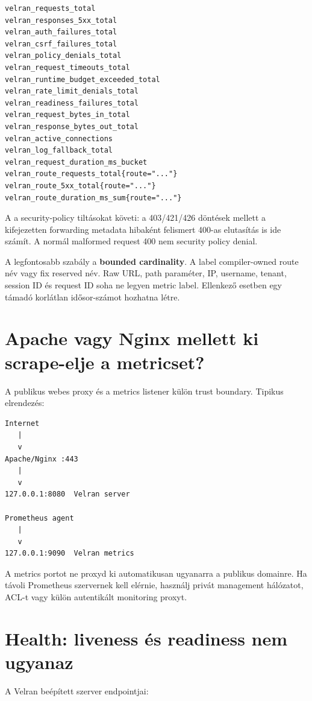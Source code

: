 \begin{lstlisting}
velran_requests_total
velran_responses_5xx_total
velran_auth_failures_total
velran_csrf_failures_total
velran_policy_denials_total
velran_request_timeouts_total
velran_runtime_budget_exceeded_total
velran_rate_limit_denials_total
velran_readiness_failures_total
velran_request_bytes_in_total
velran_response_bytes_out_total
velran_active_connections
velran_log_fallback_total
velran_request_duration_ms_bucket
velran_route_requests_total{route="..."}
velran_route_5xx_total{route="..."}
velran_route_duration_ms_sum{route="..."}
\end{lstlisting}

A  a security-policy tiltásokat követi: a 403/421/426 döntések mellett a kifejezetten forwarding metadata hibaként felismert 400-as elutasítás is ide számít. A normál malformed request 400 nem security policy denial.

A legfontosabb szabály a \textbf{bounded cardinality}. A  label compiler-owned route név vagy fix reserved név. Raw URL, path paraméter, IP, username, tenant, session ID és request ID soha ne legyen metric label. Ellenkező esetben egy támadó korlátlan idősor-számot hozhatna létre.

\Needspace{0.42\textheight}
\section{Apache vagy Nginx mellett ki scrape-elje a metricset?}

A publikus webes proxy és a metrics listener külön trust boundary. Tipikus elrendezés:

\begin{lstlisting}
Internet
   |
   v
Apache/Nginx :443
   |
   v
127.0.0.1:8080  Velran server

Prometheus agent
   |
   v
127.0.0.1:9090  Velran metrics
\end{lstlisting}

A metrics portot ne proxyd ki automatikusan ugyanarra a publikus domainre. Ha távoli Prometheus szervernek kell elérnie, használj privát management hálózatot, ACL-t vagy külön autentikált monitoring proxyt.

\section{Health: liveness és readiness nem ugyanaz}

A Velran beépített szerver endpointjai:


